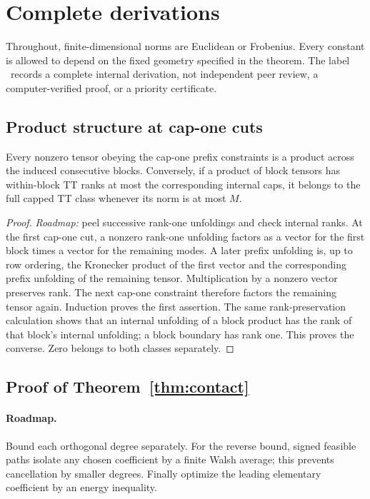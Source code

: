 \section{Complete derivations}\label{app:proofs}
Throughout, finite-dimensional norms are Euclidean or Frobenius. Every constant is allowed to depend on the fixed geometry specified in the theorem. The label \pr\ records a complete internal derivation, not independent peer review, a computer-verified proof, or a priority certificate.

\subsection{Product structure at cap-one cuts}
\begin{lemma}\label{lem:blocks}
Every nonzero tensor obeying the cap-one prefix constraints is a product across the induced consecutive blocks. Conversely, if a product of block tensors has within-block TT ranks at most the corresponding internal caps, it belongs to the full capped TT class whenever its norm is at most $M$.
\end{lemma}
\begin{proof}
\emph{Roadmap:} peel successive rank-one unfoldings and check internal ranks. At the first cap-one cut, a nonzero rank-one unfolding factors as a vector for the first block times a vector for the remaining modes. A later prefix unfolding is, up to row ordering, the Kronecker product of the first vector and the corresponding prefix unfolding of the remaining tensor. Multiplication by a nonzero vector preserves rank. The next cap-one constraint therefore factors the remaining tensor again. Induction proves the first assertion. The same rank-preservation calculation shows that an internal unfolding of a block product has the rank of that block's internal unfolding; a block boundary has rank one. This proves the converse. Zero belongs to both classes separately.
\end{proof}

\subsection{Proof of Theorem~\ref{thm:contact}}
\paragraph{Roadmap.} Bound each orthogonal degree separately. For the reverse bound, signed feasible paths isolate any chosen coefficient by a finite Walsh average; this prevents cancellation by smaller degrees. Finally optimize the leading elementary coefficient by an energy inequality.


